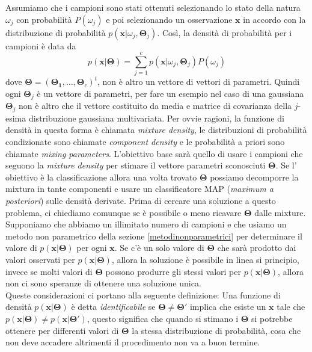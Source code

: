 \noindent Assumiamo che i campioni sono stati ottenuti selezionando lo stato della natura $\omega_j$ con probabilità $P(\omega_j)$ e poi selezionando un osservazione $\mathbf{x}$ in accordo con la distribuzione di probabilità $p(\mathbf{x}|\omega_j, \mathbf{\Theta}_j)$. Così, la densità di probabilità per i campioni è data da
\begin{equation}
p(\mathbf{x}|\mathbf{\Theta}) = \sum_{j=1}^c p(\mathbf{x}|\omega_j, \mathbf{\Theta}_j) P(\omega_j)
\end{equation}
dove $\mathbf{\Theta} = (\mathbf{\Theta_1}, \dots, \mathbf{\Theta}_c)^t$, non è altro un vettore di vettori di parametri. Quindi ogni $\mathbf{\Theta}_j$ è un vettore di parametri, per fare un esempio nel caso di una gaussiana $\mathbf{\Theta}_j$ non è altro che il vettore costituito da media e matrice di covarianza della $j$-esima distribuzione gaussiana multivariata. Per ovvie ragioni, la funzione di densità in questa forma è chiamata \emph{mixture density}, le distribuzioni di probabilità condizionate sono chiamate \emph{component density} e le probabilità a priori sono chiamate \emph{mixing parameters}. L'obiettivo base sarà quello di usare i campioni che seguono la \emph{mixture density} per stimare il vettore parametri sconosciuti $\mathbf{\Theta}$.  Se l' obiettivo è la classificazione allora una volta trovato $\mathbf{\Theta}$ possiamo decomporre la mixtura in tante componenti e usare un classificatore MAP (\emph{maximum a posteriori}) sulle densità derivate. Prima di cercare una soluzione a questo problema, ci chiediamo comunque se è possibile o meno ricavare $\mathbf{\Theta}$ dalle mixture. Supponiamo che abbiamo un illimitato numero di campioni e che usiamo un metodo non parametrico della sezione \ref{metodinonparametrici} per determinare il valore di $p(\mathbf{x}|\mathbf{\Theta})$ per ogni $\mathbf{x}$. Se c'è un solo valore di $\mathbf{\Theta}$ che sarà prodotto dai valori osservati per $p(\mathbf{x}|\mathbf{\Theta})$, allora la soluzione è possibile in linea si principio, invece se molti valori di $\mathbf{\Theta}$ possono produrre gli stessi valori per $p(\mathbf{x}|\mathbf{\Theta})$, allora non ci sono speranze di ottenere una soluzione unica.\\
Queste considerazioni   ci portano alla seguente definizione: Una funzione di densità $p(\mathbf{x}|\mathbf{\Theta})$ è detta \emph{identificabile} se $\mathbf{\Theta} \neq \mathbf{\Theta}'$ implica che esiste un $\mathbf{x}$ tale che $p(\mathbf{x}|\mathbf{\Theta}) \neq p(\mathbf{x}|\mathbf{\Theta}')$, questo significa che quando si stimano i $\mathbf{\Theta}$ si potrebbe ottenere per differenti valori di $\mathbf{\Theta}$ la stessa distribuzione di probabilità, cosa che non deve accadere altrimenti il procedimento non va a buon termine.
